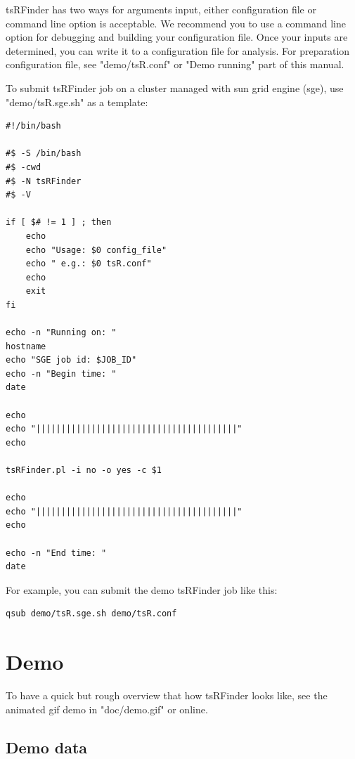 \documentclass[11pt, a4paper]{article}
\begin{document}
tsRFinder has two ways for arguments input, either configuration file or command line option is acceptable. We recommend you to use a command line option for debugging and building your configuration file. Once your inputs are determined, you can write it to a configuration file for analysis. For preparation configuration file, see "demo/tsR.conf" or "Demo running" part of this manual.

To submit tsRFinder job on a cluster managed with sun grid engine (sge), use "demo/tsR.sge.sh" as a template:

{\scriptsize \begin{tcolorbox}[colback=blue!5!white,colframe=pink!75!black,title=demo/tsR.sge.sh]
\begin{verbatim}
#!/bin/bash

#$ -S /bin/bash
#$ -cwd
#$ -N tsRFinder
#$ -V

if [ $# != 1 ] ; then
	echo
	echo "Usage: $0 config_file"
	echo " e.g.: $0 tsR.conf"
	echo
	exit
fi

echo -n "Running on: "
hostname
echo "SGE job id: $JOB_ID"
echo -n "Begin time: "
date

echo
echo "||||||||||||||||||||||||||||||||||||||||"
echo

tsRFinder.pl -i no -o yes -c $1

echo
echo "||||||||||||||||||||||||||||||||||||||||"
echo

echo -n "End time: "
date
\end{verbatim}
\end{tcolorbox}}

For example, you can submit the demo tsRFinder job like this:

{\scriptsize \begin{tcolorbox}[colback=blue!5!white,colframe=pink!75!black,title=submit a demo tsRFinder job]
\begin{verbatim}
qsub demo/tsR.sge.sh demo/tsR.conf
\end{verbatim}
\end{tcolorbox}}


\section{Demo}

To have a quick but rough overview that how tsRFinder looks like, see the animated gif demo in "doc/demo.gif" or online.

\subsection{Demo data}
\end{document}
